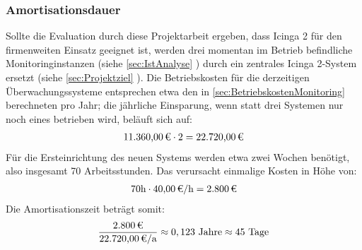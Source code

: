 \subsubsection{Amortisationsdauer}
\label{sec:Amortisationsdauer}
Sollte die Evaluation durch diese Projektarbeit ergeben, dass \glqq{}Icinga 2\grqq{} für den firmenweiten Einsatz geeignet ist, werden drei momentan im Betrieb befindliche Monitoringinstanzen (siehe \ref{sec:IstAnalyse} ) durch ein zentrales \glqq{}Icinga 2\grqq{}-System ersetzt (siehe \ref{sec:Projektziel} ). Die Betriebskosten für die derzeitigen Überwachungssysteme entsprechen etwa den in \ref{sec:BetriebskostenMonitoring}  berechneten  pro Jahr; die jährliche Einsparung, wenn statt drei Systemen nur noch eines betrieben wird, beläuft sich auf:
\begin{eqnarray}
\eur{11.360,00} \cdot 2 = \eur{22.720,00}
\end{eqnarray}
Für die Ersteinrichtung des neuen Systems werden etwa zwei Wochen benötigt, also insgesamt 70 Arbeitsstunden. Das verursacht einmalige Kosten in Höhe von:
\begin{eqnarray}
70 \mbox{h} \cdot \eur{40,00} \mbox{/h} = \eur{2.800}
\end{eqnarray}
Die Amortisationszeit beträgt somit:
\begin{eqnarray}
\frac{\eur{2.800}}{\eur{22.720,00}\mbox{/a}} \approx 0,123 \mbox{ Jahre} \approx 45 \mbox{ Tage}
\end{eqnarray}
\setcounter{equation}{0}
